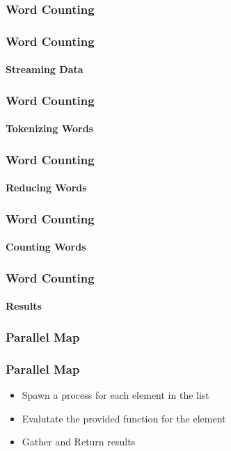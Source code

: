 \documentclass[english]{beamer}
\begin{document}
\begin{frame}
\frametitle{Word Counting}
\begin{figure}
\end{figure}
\end{frame}

\begin{frame}[fragile]
\frametitle{Word Counting}
\framesubtitle{Streaming Data}

\end{frame}

\begin{frame}[fragile]
\frametitle{Word Counting}
\framesubtitle{Tokenizing Words}

\end{frame}

\begin{frame}[fragile]
\frametitle{Word Counting}
\framesubtitle{Reducing Words}

\end{frame}

\begin{frame}[fragile]
\frametitle{Word Counting}
\framesubtitle{Counting Words}

\end{frame}

\begin{frame}[fragile]
\frametitle{Word Counting}
\framesubtitle{Results}

\end{frame}

\subsubsection{Parallel Map}
\begin{frame}
\frametitle{Parallel Map}
\begin{itemize}
\item{Spawn a process for each element in the list}
\item{Evalutate the provided function for the element}
\item{Gather and Return results}
\end{itemize}
\end{frame}
\end{document}
